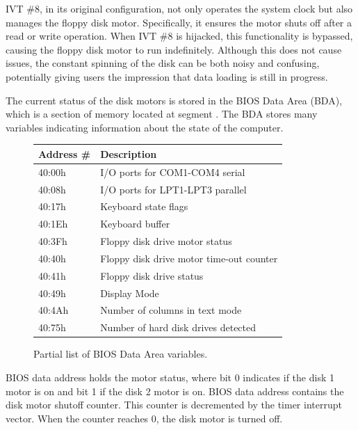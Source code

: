 \documentclass[book.tex]{subfiles}
\begin{document}
\par
IVT \#8, in its original configuration, not only operates the system clock but also manages the floppy disk motor. Specifically, it ensures the motor shuts off after a read or write operation. When IVT \#8 is hijacked, this functionality is bypassed, causing the floppy disk motor to run indefinitely. Although this does not cause issues, the constant spinning of the disk can be both noisy and confusing, potentially giving users the impression that data loading is still in progress.\\

\par
The current status of the disk motors is stored in the BIOS Data Area (BDA), which is a section of memory located at segment . The BDA stores many variables indicating information about the state of the computer.\\

\begin{figure}[H]
	\centering
	\begin{tabularx}{\textwidth}{ l p{}  }
	  \toprule
	  \textbf{Address \#} & \textbf{Description} \\ \bottomrule
40:00h	&	I/O ports for COM1-COM4 serial \\
40:08h	&	I/O ports for LPT1-LPT3 parallel \\
40:17h	&	Keyboard state flags \\
40:1Eh	&	Keyboard buffer \\
40:3Fh	&	Floppy disk drive motor status \\
40:40h	&	Floppy disk drive motor time-out counter \\
40:41h	&	Floppy disk drive status \\
40:49h & 	Display Mode \\
40:4Ah & 	Number of columns in text mode \\
40:75h & 	Number of hard disk drives detected \\
		\bottomrule
	\end{tabularx}
	\caption{Partial list of BIOS Data Area variables\protect\footnotemark.}
\end{figure}

\par
BIOS data address  holds the motor status, where bit 0 indicates if the disk 1 motor is on and bit 1 if the disk 2 motor is on. BIOS data address  contains the disk motor shutoff counter. This counter is decremented by the timer interrupt vector. When the counter reaches 0, the disk motor is turned off.\\
\end{document}
